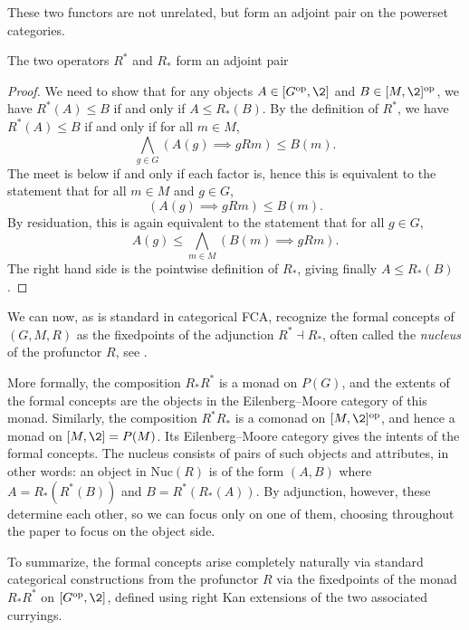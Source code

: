 These two functors are not unrelated, but form an adjoint pair on the powerset categories. 

\begin{lemma}
    \label{lm:adjoint-Delta}
    The two operators $R^*$ and $R_*$ form an adjoint pair
    \begin{center}
    \end{center}
\end{lemma}
\begin{proof}
    We need to show that for any objects $A\in [G\op, \2]$ and $B\in [M, \2]\op$, we have $R^*(A)\leq B$ if and only if $A\leq R_*(B)$. By the definition of $R^*$, we have $R^*(A)\leq B$ if and only if for all $m\in M$, 
    \[\bigwedge_{g\in G}(A(g)\implies gRm)\leq B(m).\]
    The meet is below if and only if each factor is, hence this is equivalent to the statement that for all $m\in M$ and $g\in G$,
    \[(A(g)\implies gRm) \leq B(m).\]
    By residuation, this is again equivalent to the statement that for all $g\in G$, 
    \[A(g) \leq \bigwedge_{m\in M} (B(m) \implies gRm).\]
    The right hand side is the pointwise definition of $R_*$, giving finally $A\leq R_*(B)$. 
\end{proof}

We can now, as is standard in categorical FCA, recognize the formal concepts of $(G,M,R)$ as the fixedpoints of the adjunction $R^*\dashv R_*$, often called the \emph{nucleus} of the profunctor $R$, see \cite[Chapter 5]{ferrer_2023}. 

More formally, the composition $R_* R^*$ is a monad on $P(G)$, and the extents of the formal concepts are the objects in the Eilenberg--Moore category of this monad. Similarly, the composition $R^* R_*$ is a comonad on $[M,\2]\op$, and hence a monad on $[M,\2] = P(M)$. Its Eilenberg--Moore category gives the intents of the formal concepts. The nucleus consists of pairs of such objects and attributes, in other words: an object in $\mathrm{Nuc}(R)$ is of the form $(A,B)$ where $A = R_*(R^*(B))$ and $B=R^* (R_* (A))$. By adjunction, however, these determine each other, so we can focus only on one of them, choosing throughout the paper to focus on the object side. 

To summarize, the formal concepts arise completely naturally via standard categorical constructions from the profunctor $R$ via the fixedpoints of the monad $R_*R^*$ on $[G\op, \2]$, defined using right Kan extensions of the two associated curryings. 

